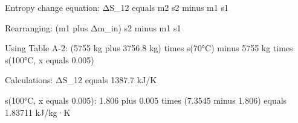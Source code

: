 Entropy change equation:  
ΔS_12 equals m2 s2 minus m1 s1  

Rearranging:  
(m1 plus Δm_in) s2 minus m1 s1  

Using Table A-2:  
(5755 kg plus 3756.8 kg) times s(70°C) minus 5755 kg times s(100°C, x equals 0.005)  

Calculations:  
ΔS_12 equals 1387.7 kJ/K  

s(100°C, x equals 0.005):  
1.806 plus 0.005 times (7.3545 minus 1.806)  
equals 1.83711 kJ/kg·K